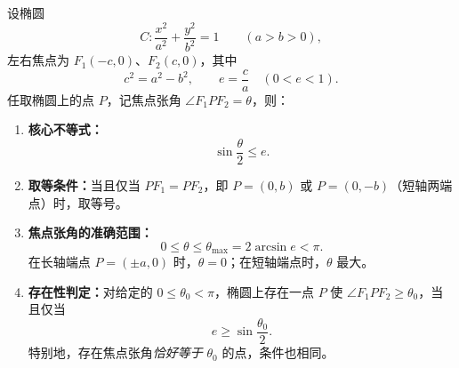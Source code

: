 \begin{statementbox}
设椭圆
\[
C:\frac{x^2}{a^2}+\frac{y^2}{b^2}=1\qquad(a>b>0),
\]
左右焦点为 $F_1(-c,0)$、$F_2(c,0)$，其中
\[
c^2=a^2-b^2,\qquad e=\frac ca\quad(0<e<1).
\]
任取椭圆上的点 $P$，记焦点张角 $\angle F_1PF_2=\theta$，则：
\begin{enumerate}
    \item \textbf{核心不等式：}
    \[
    \boxed{\sin\frac{\theta}{2}\le e.}
    \]

    \item \textbf{取等条件：}当且仅当 $PF_1=PF_2$，即
    $P=(0,b)$ 或 $P=(0,-b)$（短轴两端点）时，取等号。

    \item \textbf{焦点张角的准确范围：}
    \[
    \boxed{0\le\theta\le\theta_{\max}=2\arcsin e<\pi.}
    \]
    在长轴端点 $P=(\pm a,0)$ 时，$\theta=0$；在短轴端点时，$\theta$ 最大。

    \item \textbf{存在性判定：}对给定的 $0\le\theta_0<\pi$，椭圆上存在一点 $P$ 使
    $\angle F_1PF_2\ge\theta_0$，当且仅当
    \[
    \boxed{e\ge\sin\frac{\theta_0}{2}.}
    \]
    特别地，存在焦点张角\emph{恰好等于} $\theta_0$ 的点，条件也相同。
\end{enumerate}
\end{statementbox}
